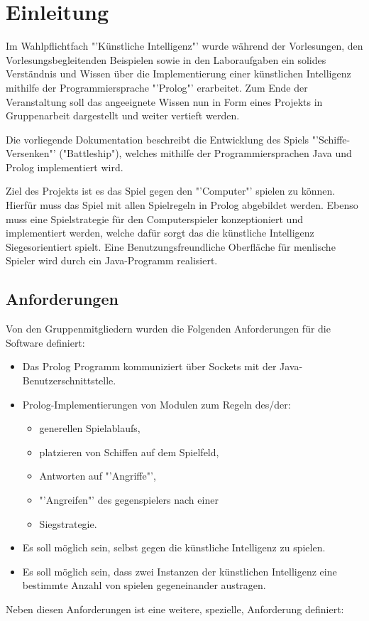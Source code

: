 \section{Einleitung}
\label{sec:Einleitung}
	Im Wahlpflichtfach "'Künstliche Intelligenz"' wurde während der Vorlesungen, den Vorlesungsbegleitenden Beispielen 
	sowie in den Laboraufgaben ein solides Verständnis und Wissen über die Implementierung einer künstlichen Intelligenz 
	mithilfe der Programmiersprache "'Prolog"' erarbeitet. Zum Ende der Veranstaltung soll das angeeignete Wissen nun in 
	Form eines Projekts in Gruppenarbeit dargestellt und weiter vertieft werden.
	
	Die vorliegende Dokumentation beschreibt die Entwicklung des Spiels "'Schiffe-Versenken"' ("Battleship"), welches 
	mithilfe der Programmiersprachen Java und Prolog implementiert wird.
	
	Ziel des Projekts ist es das Spiel gegen den "'Computer"' spielen zu können. Hierfür muss das Spiel mit allen Spielregeln 
	in Prolog abgebildet werden. Ebenso muss eine Spielstrategie für den Computerspieler konzeptioniert und implementiert werden, 
	welche dafür sorgt das die künstliche Intelligenz Siegesorientiert spielt. 
	Eine Benutzungsfreundliche Oberfläche für menlische Spieler wird durch ein Java-Programm realisiert.
	
	\subsection{Anforderungen} %
	\label{sub:anforderungen}
		Von den Gruppenmitgliedern wurden die Folgenden Anforderungen für die Software definiert:
		\begin{itemize}
			\item Das Prolog Programm kommuniziert über Sockets mit der Java-Benutzerschnittstelle.
			\item Prolog-Implementierungen von Modulen zum Regeln des/der:
			\begin{itemize}
				\item generellen Spielablaufs,
				\item platzieren von Schiffen auf dem Spielfeld,
				\item Antworten auf "'Angriffe"',
				\item "'Angreifen"' des gegenspielers nach einer 
				\item Siegstrategie.
			\end{itemize}
			\item Es soll möglich sein, selbst gegen die künstliche Intelligenz zu spielen.
			\item Es soll möglich sein, dass zwei Instanzen der künstlichen Intelligenz eine bestimmte Anzahl von spielen gegeneinander 
			austragen.
		\end{itemize}
		Neben diesen Anforderungen ist eine weitere, spezielle, Anforderung definiert:
		
